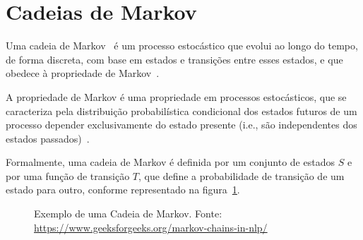 \section{Cadeias de Markov}\label{sec:cadeias-de-markov}

Uma cadeia de Markov~\cite{wiki:markov-chain} é um processo estocástico que evolui ao longo do tempo, de forma discreta, com
base em estados e transições entre esses estados, e que obedece à propriedade de Markov~\cite{isel:iasa:slides:processos-decisao-sequencial}.

A propriedade de Markov é uma propriedade em processos estocásticos, que se caracteriza pela distribuição probabilística condicional dos estados futuros de um processo depender exclusivamente do estado presente (i.e., são independentes dos estados passados)~\cite{isel:iasa:slides:processos-decisao-sequencial}.

Formalmente, uma cadeia de Markov é definida por um conjunto de estados $S$ e por uma função de transição $T$, que define a probabilidade de transição de um estado para outro,
conforme representado na figura~\ref{fig:cadeia-de-markov}.

\begin{figure}[H]
    \begin{center}
    \end{center}
    \caption{Exemplo de uma Cadeia de Markov.
    Fonte: \url{https://www.geeksforgeeks.org/markov-chains-in-nlp/}}
    \label{fig:cadeia-de-markov}
\end{figure}


